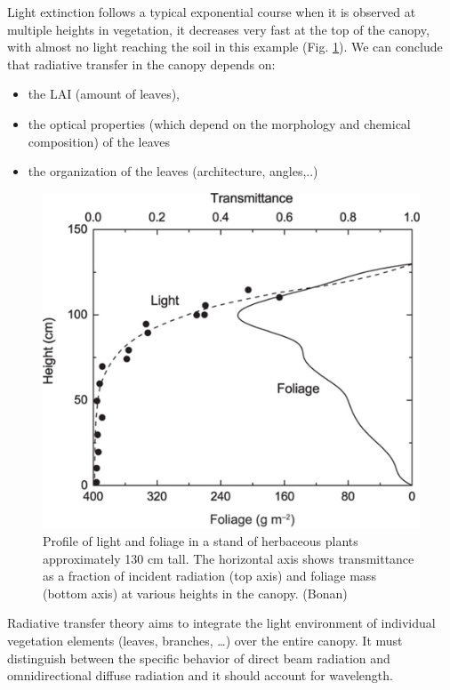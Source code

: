 \documentclass[
  12pt,
  oneside]{book}
\providecommand{\tightlist}{%
  \setlength{\itemsep}{0pt}\setlength{\parskip}{0pt}}
\begin{document}
Light extinction follows a typical exponential course when it is observed at multiple heights in vegetation, it decreases very fast at the top of the canopy, with almost no light reaching the soil in this example (Fig. \ref{fig:f36}).
We can conclude that radiative transfer in the canopy depends on:

\begin{itemize}
\tightlist
\item
  the LAI (amount of leaves),
\item
  the optical properties (which depend on the morphology and chemical composition) of the leaves
\item
  the organization of the leaves (architecture, angles,..)
\end{itemize}

\begin{figure}

{\centering \includegraphics[width=0.8\linewidth]{figures/chap3/f36_obs_profile} 

}

\caption{Profile of light and foliage in a stand of herbaceous plants approximately 130 cm tall. The horizontal axis shows transmittance as a fraction of incident radiation (top axis) and foliage mass (bottom axis) at various heights in the canopy. (Bonan)}\label{fig:f36}
\end{figure}

Radiative transfer theory aims to integrate the light environment of individual vegetation elements (leaves, branches, \ldots) over the entire canopy. It must distinguish between the specific behavior of direct beam radiation and omnidirectional diffuse radiation and it should account for wavelength.
\end{document}
